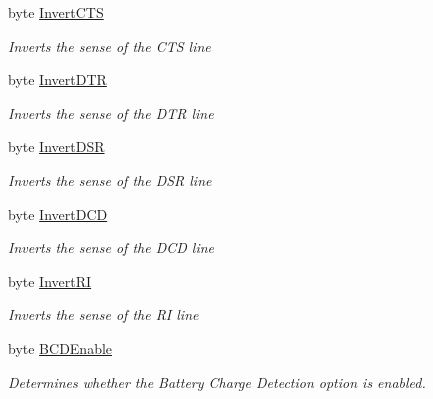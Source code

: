 \begin{DoxyCompactItemize}
byte \mbox{\hyperlink{class_f_t_d2_x_x___n_e_t_1_1_f_t_d_i_1_1_f_t___x_s_e_r_i_e_s___e_e_p_r_o_m___s_t_r_u_c_t_u_r_e_a1756b89a1ab6c46c4d57142e8d1e6bb3}{Invert\+C\+TS}}
\begin{DoxyCompactList}\small\item\em Inverts the sense of the C\+TS line \end{DoxyCompactList}\item 
byte \mbox{\hyperlink{class_f_t_d2_x_x___n_e_t_1_1_f_t_d_i_1_1_f_t___x_s_e_r_i_e_s___e_e_p_r_o_m___s_t_r_u_c_t_u_r_e_a25fd0faf512f8385d8369f530d91d7e3}{Invert\+D\+TR}}
\begin{DoxyCompactList}\small\item\em Inverts the sense of the D\+TR line \end{DoxyCompactList}\item 
byte \mbox{\hyperlink{class_f_t_d2_x_x___n_e_t_1_1_f_t_d_i_1_1_f_t___x_s_e_r_i_e_s___e_e_p_r_o_m___s_t_r_u_c_t_u_r_e_ac142d7226b3743c63eec9a4d0b049448}{Invert\+D\+SR}}
\begin{DoxyCompactList}\small\item\em Inverts the sense of the D\+SR line \end{DoxyCompactList}\item 
byte \mbox{\hyperlink{class_f_t_d2_x_x___n_e_t_1_1_f_t_d_i_1_1_f_t___x_s_e_r_i_e_s___e_e_p_r_o_m___s_t_r_u_c_t_u_r_e_a333bb4ca862dc0516559fb34be19df16}{Invert\+D\+CD}}
\begin{DoxyCompactList}\small\item\em Inverts the sense of the D\+CD line \end{DoxyCompactList}\item 
byte \mbox{\hyperlink{class_f_t_d2_x_x___n_e_t_1_1_f_t_d_i_1_1_f_t___x_s_e_r_i_e_s___e_e_p_r_o_m___s_t_r_u_c_t_u_r_e_aacd2b76def4e3b07d83d46992148a8f8}{Invert\+RI}}
\begin{DoxyCompactList}\small\item\em Inverts the sense of the RI line \end{DoxyCompactList}\item 
byte \mbox{\hyperlink{class_f_t_d2_x_x___n_e_t_1_1_f_t_d_i_1_1_f_t___x_s_e_r_i_e_s___e_e_p_r_o_m___s_t_r_u_c_t_u_r_e_af068c6ad64c5487ec445f811e526f5ad}{B\+C\+D\+Enable}}
\begin{DoxyCompactList}\small\item\em Determines whether the Battery Charge Detection option is enabled. \end{DoxyCompactList}\item 

\end{DoxyCompactItemize}

